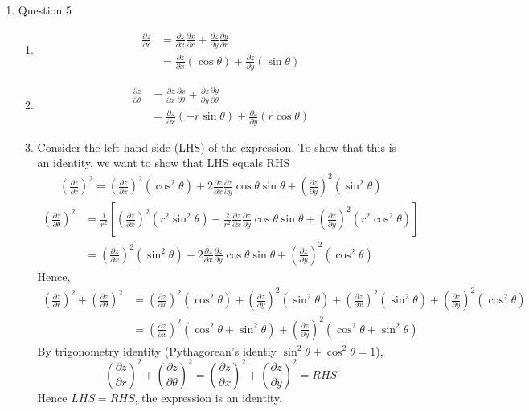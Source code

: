 \documentclass[11pt]{article}
\newcommand{\partialderiv}[2] {\frac{\partial #1}{\partial #2}}
\begin{document}
\begin{enumerate}
    \item Question 5
    \begin{enumerate}
        \item 
        $$
        \begin{aligned}
            \partialderiv{z}{r} &= \partialderiv{z}{x}\partialderiv{x}{r} + \partialderiv{z}{y}\partialderiv{y}{r} \\
            &= \partialderiv{z}{x} (\cos\theta) + \partialderiv{z}{y} (\sin\theta)
        \end{aligned}
        $$
        \item
        $$
        \begin{aligned}
            \partialderiv{z}{\theta} &= \partialderiv{z}{x}\partialderiv{x}{\theta} + \partialderiv{z}{y}\partialderiv{y}{\theta} \\
            &= \partialderiv{z}{x} (-r\sin\theta) + \partialderiv{z}{y} (r\cos\theta)
        \end{aligned}
        $$
        \item
        Consider the left hand side (LHS) of the expression. To show that this is an identity, we want to show that LHS equals RHS
        $$
        \begin{aligned}
            \left( \partialderiv{z}{r} \right)^2 =
            \left(\partialderiv{z}{x}\right)^2 (\cos^2\theta) + 2\partialderiv{z}{x}\partialderiv{z}{y}\cos\theta\sin\theta + \left(\partialderiv{z}{y}\right)^2 (\sin^2\theta)
        \end{aligned}
        $$
        $$
        \begin{aligned}
            \left( \partialderiv{z}{\theta} \right)^2 &= \frac{1}{r^2} \left[ \left(\partialderiv{z}{x}\right)^2 (r^2\sin^2\theta) -\frac{2}{r^2}\partialderiv{z}{x}\partialderiv{z}{y}\cos\theta\sin\theta + \left(\partialderiv{z}{y}\right)^2 (r^2\cos^2\theta) \right] \\
            &= \left(\partialderiv{z}{x}\right)^2 (\sin^2\theta) -2\partialderiv{z}{x}\partialderiv{z}{y}\cos\theta\sin\theta + \left(\partialderiv{z}{y}\right)^2 (\cos^2\theta)
        \end{aligned}
        $$
        Hence,
        $$
        \begin{aligned}
            \left( \partialderiv{z}{r} \right)^2 + \left( \partialderiv{z}{\theta} \right)^2 &= \left(\partialderiv{z}{x}\right)^2 (\cos^2\theta) +  \left(\partialderiv{z}{y}\right)^2 (\sin^2\theta) + \left(\partialderiv{z}{x}\right)^2 (\sin^2\theta) + \left(\partialderiv{z}{y}\right)^2 (\cos^2\theta) \\
            &= \left(\partialderiv{z}{x}\right)^2 (\cos^2\theta+\sin^2\theta) + \left(\partialderiv{z}{y}\right)^2 (\cos^2\theta+\sin^2\theta)
        \end{aligned}
        $$
        By trigonometry identity (Pythagorean's identiy $\sin^2\theta+\cos^2\theta=1$),
        $$
        \left( \partialderiv{z}{r} \right)^2 + \left( \partialderiv{z}{\theta} \right)^2 = \left(\partialderiv{z}{x}\right)^2 + \left(\partialderiv{z}{y}\right)^2 = RHS
        $$
        Hence $LHS=RHS$, the expression is an identity.
    \end{enumerate}
    

\end{enumerate}
\end{document}

